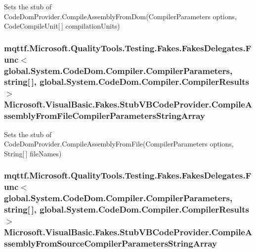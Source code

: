 Sets the stub of Code\-Dom\-Provider.\-Compile\-Assembly\-From\-Dom(\-Compiler\-Parameters options, Code\-Compile\-Unit\mbox{[}$\,$\mbox{]} compilation\-Units)

\hypertarget{class_microsoft_1_1_visual_basic_1_1_fakes_1_1_stub_v_b_code_provider_ad6429bcccb429042e2e768c36bf1e958}{
\subsubsection[{Compile\-Assembly\-From\-File\-Compiler\-Parameters\-String\-Array}]{\setlength{\rightskip}{0pt plus 5cm}mqttf.\-Microsoft.\-Quality\-Tools.\-Testing.\-Fakes.\-Fakes\-Delegates.\-Func$<$global.\-System.\-Code\-Dom.\-Compiler.\-Compiler\-Parameters, string\mbox{[}$\,$\mbox{]}, global.\-System.\-Code\-Dom.\-Compiler.\-Compiler\-Results$>$ Microsoft.\-Visual\-Basic.\-Fakes.\-Stub\-V\-B\-Code\-Provider.\-Compile\-Assembly\-From\-File\-Compiler\-Parameters\-String\-Array}}\label{class_microsoft_1_1_visual_basic_1_1_fakes_1_1_stub_v_b_code_provider_ad6429bcccb429042e2e768c36bf1e958}


Sets the stub of Code\-Dom\-Provider.\-Compile\-Assembly\-From\-File(\-Compiler\-Parameters options, String\mbox{[}$\,$\mbox{]} file\-Names)

\hypertarget{class_microsoft_1_1_visual_basic_1_1_fakes_1_1_stub_v_b_code_provider_addcc4668a0e9e01fa8762c0438bc9458}{
\subsubsection[{Compile\-Assembly\-From\-Source\-Compiler\-Parameters\-String\-Array}]{\setlength{\rightskip}{0pt plus 5cm}mqttf.\-Microsoft.\-Quality\-Tools.\-Testing.\-Fakes.\-Fakes\-Delegates.\-Func$<$global.\-System.\-Code\-Dom.\-Compiler.\-Compiler\-Parameters, string\mbox{[}$\,$\mbox{]}, global.\-System.\-Code\-Dom.\-Compiler.\-Compiler\-Results$>$ Microsoft.\-Visual\-Basic.\-Fakes.\-Stub\-V\-B\-Code\-Provider.\-Compile\-Assembly\-From\-Source\-Compiler\-Parameters\-String\-Array}}\label{class_microsoft_1_1_visual_basic_1_1_fakes_1_1_stub_v_b_code_provider_addcc4668a0e9e01fa8762c0438bc9458}


